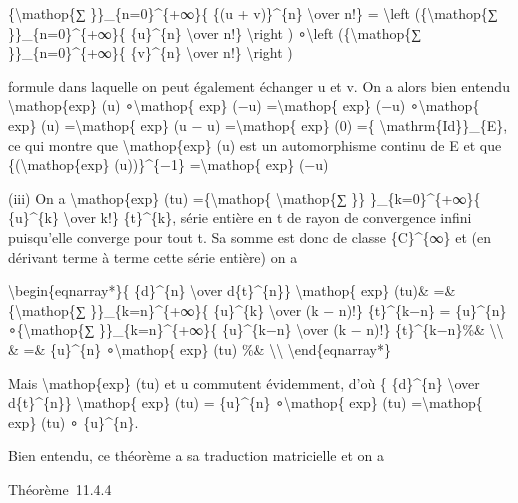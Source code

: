 \documentclass[]{article}
\begin{document}
\{\textbackslash{}mathop\{∑ \}\}\_\{n=0\}\^{}\{+∞\}\{ \{(u +
v)\}\^{}\{n\} \textbackslash{}over n!\} = \textbackslash{}left
(\{\textbackslash{}mathop\{∑ \}\}\_\{n=0\}\^{}\{+∞\}\{ \{u\}\^{}\{n\}
\textbackslash{}over n!\} \textbackslash{}right ) ∘\textbackslash{}left
(\{\textbackslash{}mathop\{∑ \}\}\_\{n=0\}\^{}\{+∞\}\{ \{v\}\^{}\{n\}
\textbackslash{}over n!\} \textbackslash{}right )

formule dans laquelle on peut également échanger u et v. On a alors bien
entendu \textbackslash{}mathop\{exp\} (u) ∘\textbackslash{}mathop\{
exp\} (−u) =\textbackslash{}mathop\{ exp\} (−u)
∘\textbackslash{}mathop\{ exp\} (u) =\textbackslash{}mathop\{ exp\} (u −
u) =\textbackslash{}mathop\{ exp\} (0) =\{
\textbackslash{}mathrm\{Id\}\}\_\{E\}, ce qui montre que
\textbackslash{}mathop\{exp\} (u) est un automorphisme continu de E et
que \{(\textbackslash{}mathop\{exp\} (u))\}\^{}\{−1\}
=\textbackslash{}mathop\{ exp\} (−u)

(iii) On a \textbackslash{}mathop\{exp\} (tu)
=\{\textbackslash{}mathop\{ \textbackslash{}mathop\{∑ \}\}
\}\_\{k=0\}\^{}\{+∞\}\{ \{u\}\^{}\{k\} \textbackslash{}over k!\}
\{t\}\^{}\{k\}, série entière en t de rayon de convergence infini
puisqu'elle converge pour tout t. Sa somme est donc de classe
\{C\}\^{}\{∞\} et (en dérivant terme à terme cette série entière) on a

\textbackslash{}begin\{eqnarray*\}\{ \{d\}\^{}\{n\} \textbackslash{}over
d\{t\}\^{}\{n\}\} \textbackslash{}mathop\{ exp\} (tu)\& =\&
\{\textbackslash{}mathop\{∑ \}\}\_\{k=n\}\^{}\{+∞\}\{ \{u\}\^{}\{k\}
\textbackslash{}over (k − n)!\} \{t\}\^{}\{k−n\} = \{u\}\^{}\{n\}
∘\{\textbackslash{}mathop\{∑ \}\}\_\{k=n\}\^{}\{+∞\}\{ \{u\}\^{}\{k−n\}
\textbackslash{}over (k − n)!\} \{t\}\^{}\{k−n\}\%\&
\textbackslash{}\textbackslash{} \& =\& \{u\}\^{}\{n\}
∘\textbackslash{}mathop\{ exp\} (tu) \%\&
\textbackslash{}\textbackslash{} \textbackslash{}end\{eqnarray*\}

Mais \textbackslash{}mathop\{exp\} (tu) et u commutent évidemment, d'où
\{ \{d\}\^{}\{n\} \textbackslash{}over d\{t\}\^{}\{n\}\}
\textbackslash{}mathop\{ exp\} (tu) = \{u\}\^{}\{n\}
∘\textbackslash{}mathop\{ exp\} (tu) =\textbackslash{}mathop\{ exp\}
(tu) ∘ \{u\}\^{}\{n\}.

Bien entendu, ce théorème a sa traduction matricielle et on a

Théorème~11.4.4
\end{document}
